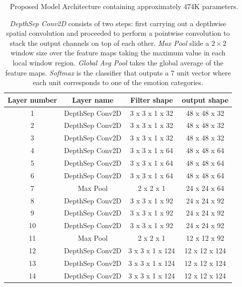 \documentclass[master]{thesis-uestc}
\begin{document}
\begin{table}[ht]
\renewcommand{\arraystretch}{1}
\caption{\,\,\,\,\,Proposed Model Architecture containing approximately 474K parameters.}
\caption*{\textit{DepthSep Conv2D} consists of two steps: first carrying out a depthwise spatial convolution and proceeded to perform a pointwise convolution to stack the output channels on top of each other. \textit{Max Pool} slide a $2 \times 2$ window size over the feature maps taking the maximum value in each local window region. \textit{Global Avg Pool} takes the global average of the feature maps. \textit{Softmax} is the classifier that outputs a 7 unit vector where each unit corresponds to one of the emotion categories.}
\label{model_arch}
\begin{center}
\begin{tabular}{|c|c|c|c|}
\hline
\textbf{Layer number} & \textbf{Layer name} & \textbf{Filter shape} & \textbf{output shape}\\ \hline
1 & DepthSep Conv2D & 3 x 3 x 1 x 32 & 48 x 48 x 32\\ \hline
2 & DepthSep Conv2D & 3 x 3 x 1 x 32 & 48 x 48 x 32\\ \hline
3 & DepthSep Conv2D & 3 x 3 x 1 x 32 & 48 x 48 x 32\\  \hline

4 & DepthSep Conv2D & 3 x 3 x 1 x 64 & 48 x 48 x 64\\ \hline
5 & DepthSep Conv2D & 3 x 3 x 1 x 64 & 48 x 48 x 64\\ \hline
6 & DepthSep Conv2D & 3 x 3 x 1 x 64 & 48 x 48 x 64\\  \hline

7 & Max Pool & 2 x 2 x 1 & 24 x 24 x 64\\ \hline

8 & DepthSep Conv2D & 3 x 3 x 1 x 92 & 24 x 24 x 92\\ \hline
9 & DepthSep Conv2D & 3 x 3 x 1 x 92 & 24 x 24 x 92\\ \hline
10 & DepthSep Conv2D & 3 x 3 x 1 x 92 & 24 x 24 x 92\\ \hline

11 & Max Pool & 2 x 2 x 1 & 12 x 12 x 92\\ \hline

12 & DepthSep Conv2D & 3 x 3 x 1 x 124 & 12 x 12 x 124\\ \hline
13 & DepthSep Conv2D & 3 x 3 x 1 x 124 & 12 x 12 x 124\\ \hline
14 & DepthSep Conv2D & 3 x 3 x 1 x 124 & 12 x 12 x 124\\ \hline


\end{tabular}
\end{center}
\end{table}
\end{document}
